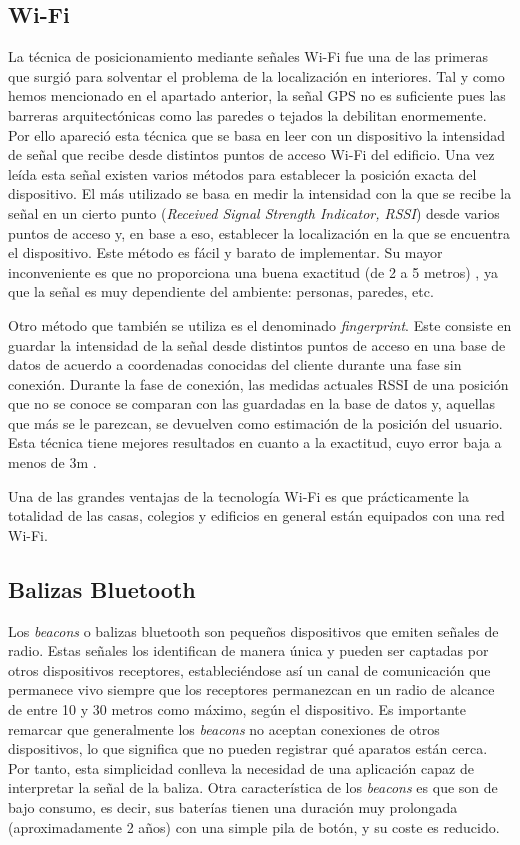 \subsection{Wi-Fi}

La técnica de posicionamiento mediante señales Wi-Fi fue una de las primeras que surgió para solventar el problema de la localización en interiores. Tal y como hemos mencionado en el apartado anterior, la señal GPS no es suficiente pues las barreras arquitectónicas como las paredes o tejados la debilitan enormemente. Por ello apareció esta técnica que se basa en leer con un dispositivo la intensidad de señal que recibe desde distintos puntos de acceso Wi-Fi del edificio. Una vez leída esta señal existen varios métodos para establecer la posición exacta del dispositivo. El más utilizado se basa en medir la intensidad con la que se recibe la señal en un cierto punto (\textit{Received Signal Strength Indicator, RSSI}) desde varios puntos de acceso y, en base a eso, establecer la localización en la que se encuentra el dispositivo. Este método es fácil y barato de implementar. Su mayor inconveniente es que no proporciona una buena exactitud (de 2 a 5 metros) \citep{wifipositioning}, ya que la señal es muy dependiente del ambiente: personas, paredes, etc.

Otro método que también se utiliza es el denominado \textit{fingerprint}. Este consiste en guardar la intensidad de la señal desde distintos puntos de acceso en una base de datos de acuerdo a coordenadas conocidas del cliente durante una fase sin conexión. Durante la fase de conexión, las medidas actuales RSSI de una posición que no se conoce se comparan con las guardadas en la base de datos y, aquellas que más se le parezcan, se devuelven como estimación de la posición del usuario. Esta técnica tiene mejores resultados en cuanto a la exactitud, cuyo error baja a menos de 3m \citep{wifipositioning}. 

Una de las grandes ventajas de la tecnología Wi-Fi es que prácticamente la totalidad de las casas, colegios y edificios en general están equipados con una red Wi-Fi.


\subsection{Balizas Bluetooth}

Los \textit{beacons} o balizas bluetooth son pequeños dispositivos que emiten señales de radio. Estas señales los identifican de manera única y pueden ser captadas por otros dispositivos receptores, estableciéndose así un canal de comunicación que permanece vivo siempre que los receptores permanezcan en un radio de alcance de entre 10 y 30 metros como máximo, según el dispositivo. Es importante remarcar que generalmente los \textit{beacons} no aceptan conexiones de otros dispositivos, lo que significa que no pueden registrar qué aparatos están cerca. Por tanto, esta simplicidad conlleva la necesidad de una aplicación capaz de interpretar la señal de la baliza. Otra característica de los \textit{beacons} es que son de bajo consumo, es decir, sus baterías tienen una duración muy prolongada (aproximadamente 2 años) con una simple pila de botón, y su coste es reducido.

